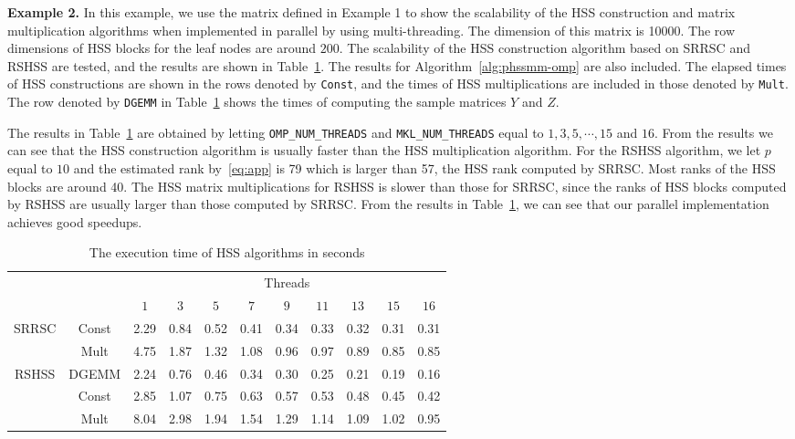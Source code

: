 \documentclass[times]{nlaauth}
\newcounter{algorithm}
\begin{document}
{\bf Example 2.} In this example, we use the matrix defined in Example 1 to show the
scalability of the HSS construction and matrix multiplication algorithms when implemented in parallel by using multi-threading.
The dimension of this matrix is 10000.
The row dimensions of HSS blocks for the leaf nodes are around $200$. The scalability of the HSS construction algorithm based on SRRSC and RSHSS are tested,
and the results are shown in Table~\ref{tab:Ex1-speedups}.
The results for Algorithm~\ref{alg:phssmm-omp} are also included.
The elapsed times of HSS constructions are shown in the rows denoted by \texttt{Const}, and
the times of HSS multiplications are included in those denoted by \texttt{Mult}.
The row denoted by \texttt{DGEMM} in Table~\ref{tab:Ex1-speedups} shows the times of computing the
sample matrices $Y$ and $Z$.

The results in Table~\ref{tab:Ex1-speedups} are obtained by letting \texttt{OMP\_NUM\_THREADS} and \texttt{MKL\_NUM\_THREADS}
equal to $1, 3, 5, \cdots, 15$ and $16$.
From the results we can see that the HSS construction algorithm is usually faster than the HSS multiplication algorithm.
For the RSHSS algorithm, we let $p$ equal to $10$ and the estimated rank by~\eqref{eq:app} is 79 which is
larger than 57, the HSS rank computed by SRRSC.
Most ranks of the HSS blocks are around 40.
The HSS matrix multiplications for RSHSS is slower than those for SRRSC,
since the ranks of HSS blocks computed by RSHSS are usually larger than those computed by SRRSC.
From the results in Table~\ref{tab:Ex1-speedups}, we can see that our parallel implementation
achieves good speedups.

\begin{table}[ptbh]
\caption{The execution time of HSS algorithms in seconds}\label{tab:Ex1-speedups}
\begin{center}\begin{tabular}
[c]{|c|c|c|c|c|c|c|c|c|c|c|}\hline
\multicolumn{2}{|c|}{ \multirow{2}{*}{Method} } & \multicolumn{9}{c|}{Threads}  \\ \cline{3-11}
\multicolumn{2}{|c|}{}         &   $1$ & $3$  & $5$  & $7$  & $9$  & $11$ & $13$ & $15$ & $16$  \\ \hline \hline
\multirow{2}{*}{SRRSC} & Const &  2.29 & 0.84 & 0.52 & 0.41 & 0.34 & 0.33 & 0.32 & 0.31 & 0.31   \\ \cline{2-11}
                       & Mult  &  4.75 & 1.87 & 1.32 & 1.08 & 0.96 & 0.97 & 0.89  & 0.85 & 0.85   \\ \hline \hline
\multirow{3}{*}{RSHSS} & DGEMM &  2.24 & 0.76 & 0.46 & 0.34 & 0.30 & 0.25 & 0.21 & 0.19 & 0.16  \\ \cline{2-11}
                       & Const &  2.85 & 1.07 & 0.75 & 0.63 & 0.57 & 0.53 & 0.48 & 0.45 & 0.42  \\ \cline{2-11}
                       & Mult &  8.04 & 2.98  & 1.94 & 1.54 & 1.29 & 1.14 & 1.09 & 1.02 & 0.95  \\ \hline
\end{tabular}
\end{center}
\end{table}
\end{document}
